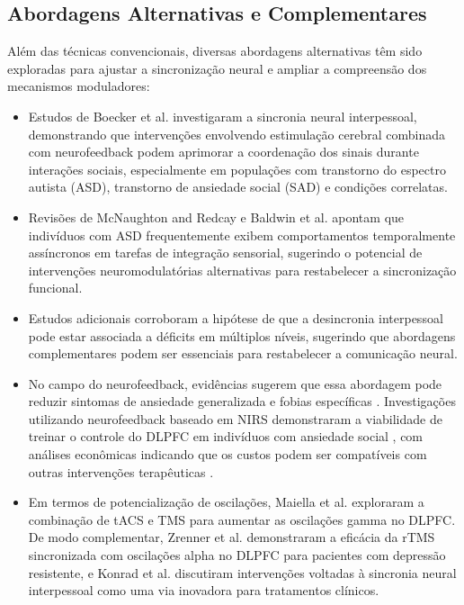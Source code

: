 \subsection{Abordagens Alternativas e Complementares}
Além das técnicas convencionais, diversas abordagens alternativas têm sido exploradas para ajustar a sincronização neural e ampliar a compreensão dos mecanismos moduladores:
\begin{itemize}
    \item Estudos de Boecker et al. \cite{boecker2024interpersonal} investigaram a sincronia neural interpessoal, demonstrando que intervenções envolvendo estimulação cerebral combinada com neurofeedback podem aprimorar a coordenação dos sinais durante interações sociais, especialmente em populações com transtorno do espectro autista (ASD), transtorno de ansiedade social (SAD) e condições correlatas.
    \item Revisões de McNaughton and Redcay \cite{mcnaughton2020interpersonal} e Baldwin et al. \cite{baldwin2014evidence} apontam que indivíduos com ASD frequentemente exibem comportamentos temporalmente assíncronos em tarefas de integração sensorial, sugerindo o potencial de intervenções neuromodulatórias alternativas para restabelecer a sincronização funcional.
    \item Estudos adicionais \cite{gerloff2022autism, quinones2021dysfunction, key2022greater, tanabe2012hard} corroboram a hipótese de que a desincronia interpessoal pode estar associada a déficits em múltiplos níveis, sugerindo que abordagens complementares podem ser essenciais para restabelecer a comunicação neural.
    \item No campo do neurofeedback, evidências sugerem que essa abordagem pode reduzir sintomas de ansiedade generalizada e fobias específicas \cite{hou2021neurofeedback, zilverstand2015fmri}. Investigações utilizando neurofeedback baseado em NIRS demonstraram a viabilidade de treinar o controle do DLPFC em indivíduos com ansiedade social \cite{kimmig2019feasibility, direito2021training, steiner2014pilot, lamarca2018facilitating, catala2017treatment}, com análises econômicas indicando que os custos podem ser compatíveis com outras intervenções terapêuticas \cite{arnold2013eeg}.
    \item Em termos de potencialização de oscilações, Maiella et al. \cite{maiella2022simultaneous} exploraram a combinação de tACS e TMS para aumentar as oscilações gamma no DLPFC. De modo complementar, Zrenner et al. \cite{zrenner2020brain} demonstraram a eficácia da rTMS sincronizada com oscilações alpha no DLPFC para pacientes com depressão resistente, e Konrad et al. \cite{konrad2024interpersonal} discutiram intervenções voltadas à sincronia neural interpessoal como uma via inovadora para tratamentos clínicos.
\end{itemize}


